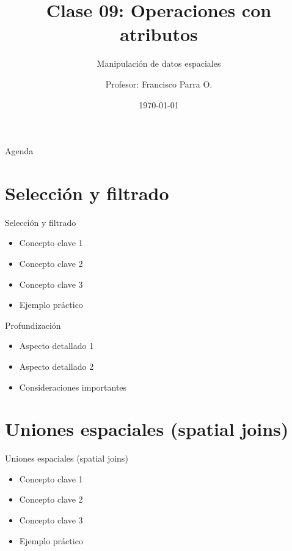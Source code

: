 \documentclass[10pt]{beamer}
\title{Clase 09: Operaciones con atributos}
\subtitle{Manipulación de datos espaciales}
\author{Profesor: Francisco Parra O.}
\institute{USACH - Ingeniería Civil en Informática}
\date{\today}
\begin{document}
\maketitle

\begin{frame}{Agenda}
    \tableofcontents
\end{frame}


\section{Selección y filtrado}

\begin{frame}{Selección y filtrado}
    \begin{itemize}
        \item Concepto clave 1
        \item Concepto clave 2
        \item Concepto clave 3
        \item Ejemplo práctico
    \end{itemize}
\end{frame}

\begin{frame}{Profundización}
    \begin{itemize}
        \item Aspecto detallado 1
        \item Aspecto detallado 2
        \item Consideraciones importantes
    \end{itemize}
\end{frame}

\section{Uniones espaciales (spatial joins)}

\begin{frame}{Uniones espaciales (spatial joins)}
    \begin{itemize}
        \item Concepto clave 1
        \item Concepto clave 2
        \item Concepto clave 3
        \item Ejemplo práctico
    \end{itemize}
\end{frame}
\end{document}
